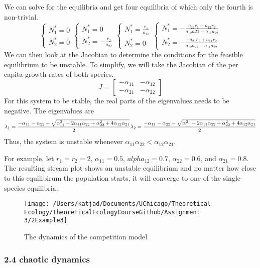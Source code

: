 \documentclass[
]{article}
\begin{document}
We can solve for the equilibria and get four equilibria of which only
the fourth is non-trivial. \[ 
\begin{cases} N_1^*=0\\ N_2^*=0\end{cases}
\begin{cases} N_1^*=0\\ N_2^*=-\frac{r_2}{a_{22}}\end{cases}
\begin{cases} N_1^*=\frac{r_1}{a_{11}}\\ N_2^*=0\end{cases}
\begin{cases} N_1^*=-\frac{a_{22}r_1-a_{12}r_2}{a_{12}a{21}-a_{11}a_{22}}\\ N_2^*=-\frac{-a_{21}r_1+a_{11}r_2}{a_{12}a_{21}-a_{11}a_{22}}\end{cases}
\] We can then look at the Jacobian to determine the conditions for the
feasible equilibrium to be unstable. To simplify, we will take the
Jacobian of the per capita growth rates of both species. \[
J= 
\begin{bmatrix}
-\alpha_{11} & -\alpha_{12}\\
-\alpha_{21} & -\alpha_{22}
\end{bmatrix}
\] For this system to be stable, the real parts of the eigenvalues needs
to be negative. The eigenvalues are \[
\lambda_1=\frac{-\alpha_{11}-\alpha_{22}+\sqrt{\alpha_{11}^2-2\alpha_{11}\alpha_{22}+\alpha_{22}^2+4\alpha_{12}\alpha_{21}}}{2}\\
\lambda_2=\frac{-\alpha_{11}-\alpha_{22}-\sqrt{\alpha_{11}^2-2\alpha_{11}\alpha_{22}+\alpha_{22}^2+4\alpha_{12}\alpha_{21}}}{2}
\] Thus, the system is unstable whenever
\(\alpha_{11}\alpha_{22}<\alpha_{12}\alpha_{21}\).

For example, let \(r_1=r_2=2\), \(\alpha_{11}=0.5\), \(alpha_{12}=0.7\),
\(\alpha_{22}=0.6\), and \(\alpha_{21}=0.8\). The resulting stream plot
shows an unstable equilibrium and no matter how close to this
equilibirum the population starts, it will converge to one of the
single-species equilibria.

\begin{figure}
\centering
\texttt{[image: /Users/katjad/Documents/UChicago/Theoretical Ecology/TheoreticalEcologyCourseGithub/Assignment 3/2Example3]}
\caption{The dynamics of the competition model}
\end{figure}

\hypertarget{chaotic-dynamics}{%
\subsubsection{2.4 chaotic dynamics}\label{chaotic-dynamics}}
\end{document}

